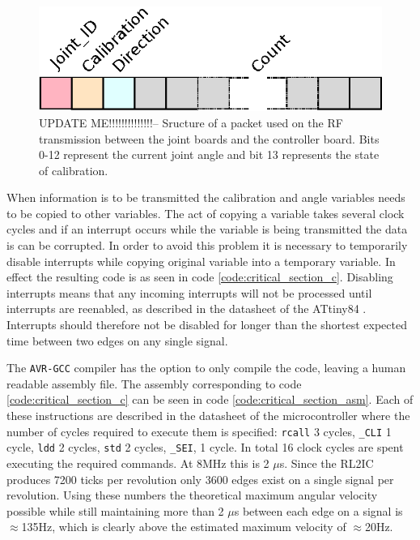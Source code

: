 \begin{figure}[h]
	\centering
	\includegraphics[width=.5\linewidth]{graphics/rf_packet}
	\caption[RF transmission packet used from the joint board.]{UPDATE ME!!!!!!!!!!!!!!--  Sructure of a packet used on the RF transmission between the joint boards and the controller board. Bits 0-12 represent the current joint angle and bit 13 represents the state of calibration.}
	\label{fig:rfpacket}
\end{figure}

When information is to be transmitted the calibration and angle variables needs to be copied to other variables.
The act of copying a variable takes several clock cycles and if an interrupt occurs while the variable is being transmitted the data is can be corrupted.
In order to avoid this problem it is necessary to temporarily disable interrupts while copying original variable into a temporary variable. 
In effect the resulting code is as seen in code \ref{code:critical_section_c}.
Disabling interrupts means that any incoming interrupts will not be processed until interrupts are reenabled, as described in the datasheet of the ATtiny84 \cite{attiny84}.
Interrupts should therefore not be disabled for longer than the shortest expected time between two edges on any single signal.

The \texttt{AVR-GCC} compiler has the option to only compile the code, leaving a human readable assembly file.
The assembly corresponding to code \ref{code:critical_section_c} can be seen in code \ref{code:critical_section_asm}.
Each of these instructions are described in the datasheet of the microcontroller where the number of cycles required to execute them is specified: \texttt{rcall} 3 cycles, \texttt{\_CLI} 1 cycle, \texttt{ldd} 2 cycles, \texttt{std} 2 cycles, \texttt{\_SEI}, 1 cycle.
In total 16 clock cycles are spent executing the required commands.
At 8MHz this is 2 $\mu$s.
Since the RL2IC produces 7200 ticks per revolution only 3600 edges exist on a single signal per revolution. 
Using these numbers the theoretical maximum angular velocity possible while still maintaining more than 2 $\mu$s between each edge on a signal is $\approx$135Hz, which is clearly above the estimated maximum velocity of $\approx$20Hz.

